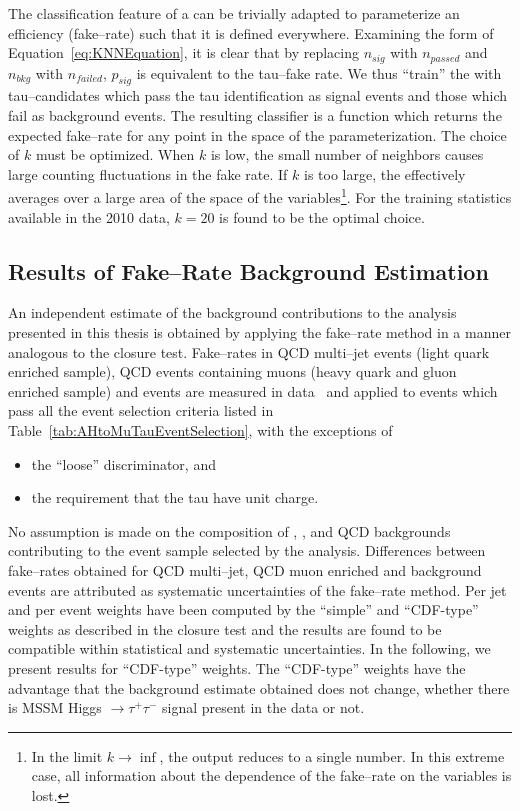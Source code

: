 The classification feature of a \kNN can be trivially adapted to parameterize an
efficiency (fake--rate) such that it is defined everywhere.  Examining the form
of Equation~\ref{eq:KNNEquation}, it is clear that by replacing $n_{sig}$ with
$n_{passed}$ and $n_{bkg}$ with $n_{failed}$, $p_{sig}$ is equivalent to the
tau--fake rate.  We thus ``train'' the \kNN with tau--candidates which pass the
tau identification as signal events and those which fail as background events.
The resulting classifier is a function which returns the expected fake--rate for
any point in the space of the parameterization.  The choice of $k$ must be
optimized.  When $k$ is low, the small number of neighbors causes large counting
fluctuations in the fake rate.  If $k$ is too large, the \kNN effectively
averages over a large area of the space of the variables\footnote{In the limit
$k\to\inf$, the \kNN output reduces to a single number.  In this extreme case,
all information about the dependence of the fake--rate on the variables is
lost.}.  For the training statistics available in the 2010 data, $k=20$ is found
to be the optimal choice.

\subsection{Results of Fake--Rate Background Estimation}
%
An independent estimate of the background contributions to the analysis
presented in this thesis is obtained by applying the fake--rate method in a
manner analogous to the closure test.  Fake--rates in QCD multi--jet events
(light quark enriched sample), QCD events containing muons (heavy quark and
gluon enriched sample) and \WpJets events are measured in
data~\cite{CMS-PAS-PFT-10-004,CMS-PAS-TAU-11-001} and applied to events which
pass all the event selection criteria listed in
Table~\ref{tab:AHtoMuTauEventSelection}, with the exceptions of 
\begin{itemize}
  \item the ``loose'' \hpsTanc discriminator, and
  \item the requirement that the tau have unit charge.
\end{itemize}

No assumption is made on the composition of \ZMM, \WpJets,
\ttbarpJets and QCD backgrounds contributing to the event sample selected
by the analysis.  Differences between fake--rates obtained for QCD multi--jet,
QCD muon enriched and \WpJets background events are attributed as systematic
uncertainties of the fake--rate method.  Per jet and per event weights have been
computed by the ``simple'' and ``CDF-type'' weights as described
in the closure test and the results are found to be compatible within
statistical and systematic uncertainties.  In the following, we present results
for ``CDF-type'' weights.  The ``CDF-type'' weights have the advantage that the
background estimate obtained does not change, whether there is MSSM Higgs $\to
\tau^{+} \tau^{-}$ signal present in the data or not.

